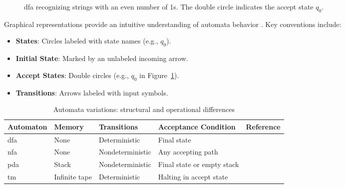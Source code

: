 \begin{figure}[htbp]
    \centering
    \caption{\gls{dfa} recognizing strings with an even number of 1s. The double circle indicates the accept state $q_0$.}
    \label{fig:cfa-example}
\end{figure}

\begin{observation}
Graphical representations provide an intuitive understanding of automata behavior \cite{kozen1997automata, sudkamp2006languages}. 
Key conventions include:
\begin{itemize}
    \item \textbf{States}: Circles labeled with state names (e.g., $q_0$).
    \item \textbf{Initial State}: Marked by an unlabeled incoming arrow.
    \item \textbf{Accept States}: Double circles (e.g., $q_0$ in Figure~\ref{fig:cfa-example}).
    \item \textbf{Transitions}: Arrows labeled with input symbols.
\end{itemize}
\end{observation}

\begin{table}[htbp]
    \centering
    \begin{adjustbox}{max width=\textwidth}
      \begin{tabular}{@{}lllll@{}}
          \toprule
          \textbf{Automaton} & \textbf{Memory} & \textbf{Transitions} & \textbf{Acceptance Condition} & \textbf{Reference} \\ \midrule
          \gls{dfa} & None & Deterministic & Final state & \cite{sipser2013introduction} \\
          \gls{nfa} & None & Nondeterministic & Any accepting path & \cite{hopcroft2006introduction} \\
          \gls{pda} & Stack & Nondeterministic & Final state or empty stack & \cite{sipser2013introduction} \\
          \gls{tm} & Infinite tape & Deterministic & Halting in accept state & \cite{turing1936computable} \\
          \bottomrule
      \end{tabular}
    \end{adjustbox}
    \caption{Automata variations: structural and operational differences}
    \label{tab:automata-variations}
\end{table}
